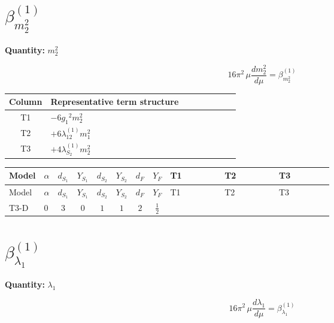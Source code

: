 \documentclass[8pt]{article}
\begin{document}
\begin{landscape}
\section*{$\beta_{m_2^2}^{(1)}$}
\noindent\textbf{Quantity: }$m_2^2$\par\smallskip
\[16\pi^2\,\mu\frac{d m_2^2}{d\mu}=\beta_{m_2^2}^{(1)}\]
\begin{center}
\begin{tabular}{@{}c >{\raggedright\arraybackslash}p{0.82\linewidth}@{}}
\toprule
Column & Representative term structure \\
\midrule
T1 & \(\displaystyle -6 {g_1}^2 {m_2^2}\) \\
\midrule
T2 & \(\displaystyle +6 {\lambda_{12}^{(1)}} {m_1^2}\) \\
\midrule
T3 & \(\displaystyle +4 {\lambda_{S_2}^{(1)}} {m_2^2}\) \\
\midrule
\bottomrule
\end{tabular}
\end{center}
\smallskip
\tiny
\begin{longtable}{@{}llcccccc >{\raggedright\arraybackslash}p{0.21\linewidth} >{\raggedright\arraybackslash}p{0.21\linewidth} >{\raggedright\arraybackslash}p{0.21\linewidth}@{}}
\toprule
Model & $\alpha$ & $d_{S_1}$ & $Y_{S_1}$ & $d_{S_2}$ & $Y_{S_2}$ & $d_F$ & $Y_F$ & T1 & T2 & T3 \\
\midrule
\endfirsthead
\toprule
Model & $\alpha$ & $d_{S_1}$ & $Y_{S_1}$ & $d_{S_2}$ & $Y_{S_2}$ & $d_F$ & $Y_F$ & T1 & T2 & T3 \\
\midrule
\endhead
T3-D & $0$ & $3$ & $0$ & $1$ & $1$ & $2$ & $\frac{1}{2}$ & \scriptsize\adjustbox{max width=\linewidth}{$\begin{gathered} -6 {g_1}^2 {m_2^2}\end{gathered}$} & \scriptsize\adjustbox{max width=\linewidth}{$\begin{gathered} +6 {\lambda_{12}^{(1)}} {m_1^2}\end{gathered}$} & \scriptsize\adjustbox{max width=\linewidth}{$\begin{gathered} +4 {\lambda_{S_2}^{(1)}} {m_2^2}\end{gathered}$} \\
\midrule
\bottomrule
\end{longtable}
\clearpage
\section*{$\beta_{\lambda_1}^{(1)}$}
\noindent\textbf{Quantity: }$\lambda_1$\par\smallskip
\[16\pi^2\,\mu\frac{d \lambda_1}{d\mu}=\beta_{\lambda_1}^{(1)}\]

\end{landscape}
\end{document}
